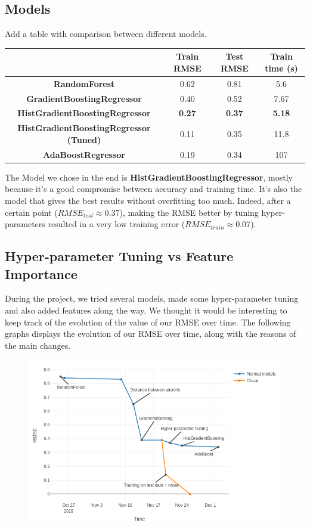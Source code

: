\documentclass[a4paper,12pt,twoside]{article}
\begin{document}
\subsection{Models}
Add a table with comparison between different models.
\begin{center}
	\begin{tabular}{| c | c | c | c |} 
		\hline
			 & Train RMSE & Test RMSE & Train time (s) \\ [0.5ex] 
		\hline
		\textbf{RandomForest} & 0.62 & 0.81 & 5.6 \\ 
		\hline
		\textbf{GradientBoostingRegressor} & 0.40 & 0.52 & 7.67 \\
		\hline
		\textbf{HistGradientBoostingRegressor} & \textbf{0.27} & \textbf{0.37} & \textbf{5.18} \\
		\hline
		\textbf{HistGradientBoostingRegressor (Tuned)} & 0.11 & 0.35 & 11.8 \\
		\hline
		\textbf{AdaBoostRegressor} & 0.19 & 0.34 & 107 \\
		\hline
	\end{tabular}
\end{center}

The Model we chose in the end is \textbf{HistGradientBoostingRegressor}, mostly because it's a good compromise between accuracy and training time. It's also the model that gives the best results without overfitting too much. Indeed, after a certain point ($RMSE_{test} \approx 0.37$), making the RMSE better by tuning hyper-parameters resulted in a very low training error ($RMSE_{train} \approx 0.07$).


\subsection{Hyper-parameter Tuning vs Feature Importance}

During the project, we tried several models, made some hyper-parameter tuning and also added features along the way. We thought it would be interesting to keep track of the evolution of the value of our RMSE over time.
The following graphs displays the evolution of our RMSE over time, along with the reasons of the main changes.

\begin{figure}[H]
	\centering
	\includegraphics[scale=0.5]{rmse_evolution.png}
\end{figure}
\end{document}
